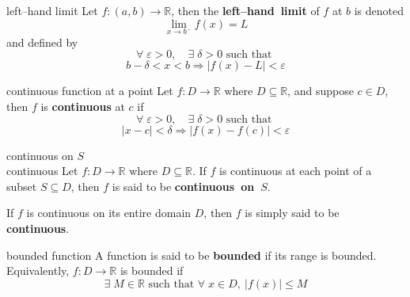 \documentclass[avery5371,grid]{flashcards}
\newcommand{\R}{\mathbb{R}}
\newcommand{\st}{\textrm{ such that }}
\begin{document}
\begin{flashcard}[Definition]{left--hand limit}
Let $f:(a,b) \rightarrow \R$, then the \mbox{\textbf{left--hand limit}}
of $f$ at $b$ is denoted \[\lim_{x \rightarrow b^{-}} f(x) = L \]
and defined by
\begin{equation*}
\forall \; \varepsilon > 0, \quad \exists \; \delta > 0 \st
\end{equation*}
\begin{equation*}
b - \delta < x < b \Rightarrow |f(x) - L| < \varepsilon
\end{equation*}
\end{flashcard}


\begin{flashcard}[Definition]{continuous function at a point}
Let $f:D \rightarrow \R$ where $D \subseteq \R$, and suppose $c \in D$,
then $f$ is \mbox{\textbf{continuous}} at $c$ if
\begin{equation*}
\forall \; \varepsilon > 0, \quad \exists \; \delta > 0 \st
\end{equation*}
\begin{equation*}
|x-c| < \delta \Rightarrow |f(x) - f(c)| < \varepsilon
\end{equation*}
\end{flashcard}

\begin{flashcard}[Definition]{continuous on $S$\\ continuous}
Let $f:D \rightarrow \R$ where $D \subseteq \R$.  If $f$ is continuous
at each point of a subset $S \subseteq D$, then $f$ is said to be
\mbox{\textbf{continuous on $S$}}.

\medskip
If $f$ is continuous on its entire domain $D$, then $f$ is simply said
to be \mbox{\textbf{continuous}}.
\end{flashcard}


\begin{flashcard}[Definition]{bounded function}
A function is said to be \mbox{\textbf{bounded}} if its range is
bounded.  Equivalently, $f:D \rightarrow \R$ is bounded if
\begin{equation*}
\exists \; M \in \R \st \forall \; x \in D, \ |f(x)| \leq M
\end{equation*}
\end{flashcard}
\end{document}
